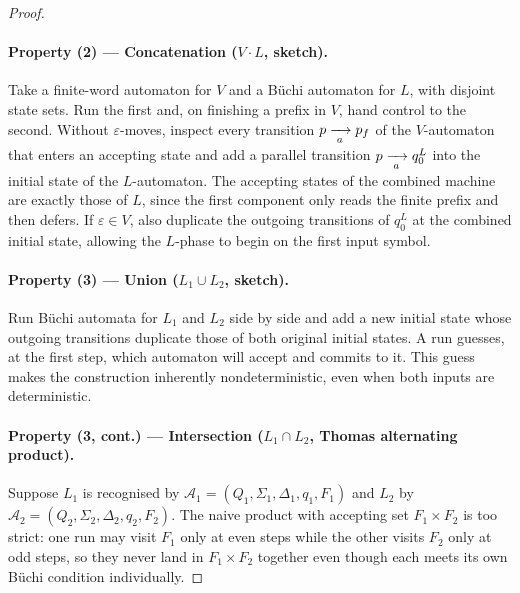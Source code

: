 \begin{proof}
\paragraph{Property (2) --- Concatenation ($V\cdot L$, sketch).}
Take a finite-word automaton for $V$ and a B\"uchi automaton for $L$, with
disjoint state sets.  Run the first and, on finishing a prefix in $V$,
hand control to the second.  Without $\varepsilon$-moves, inspect every
transition $p\xrightarrow[{\;a\;}]{}p_f$ of the $V$-automaton that enters an
accepting state and add a parallel transition $p\xrightarrow[{\;a\;}]{}q_0^L$
into the initial state of the $L$-automaton.  The accepting states of
the combined machine are exactly those of $L$, since the first component
only reads the finite prefix and then defers.  If $\varepsilon\in V$,
also duplicate the outgoing transitions of $q_0^L$ at the combined
initial state, allowing the $L$-phase to begin on the first input symbol.

\paragraph{Property (3) --- Union ($L_1\cup L_2$, sketch).}
Run B\"uchi automata for $L_1$ and $L_2$ side by side and add a new initial state
whose outgoing transitions duplicate those of both original initial
states.  A run guesses, at the first step, which automaton will accept
and commits to it.  This guess makes the construction inherently
nondeterministic, even when both inputs are deterministic.

\paragraph{Property (3, cont.) --- Intersection ($L_1\cap L_2$, Thomas alternating product).}
Suppose $L_1$ is recognised by
$\mathcal{A}_1=(Q_1,\Sigma_1,\Delta_1,q_1,F_1)$ and $L_2$ by
$\mathcal{A}_2=(Q_2,\Sigma_2,\Delta_2,q_2,F_2)$.  The naive product with
    accepting set $F_1\times F_2$ is too strict: one run may visit $F_1$
    only at even steps while the other visits $F_2$ only at odd steps, so
    they never land in $F_1\times F_2$ together even though each meets its
    own B\"uchi condition individually.


\end{proof}
